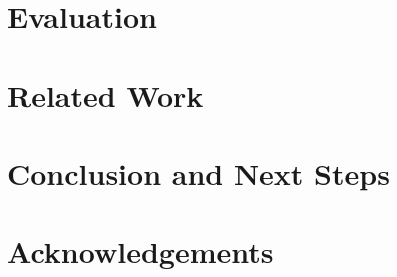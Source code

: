 \documentclass{sigplanconf}
\begin{document}
\section{Evaluation}
\label{sec:evaluation}

\section{Related Work}

\section{Conclusion and Next Steps}

\section*{Acknowledgements}



\end{document}
